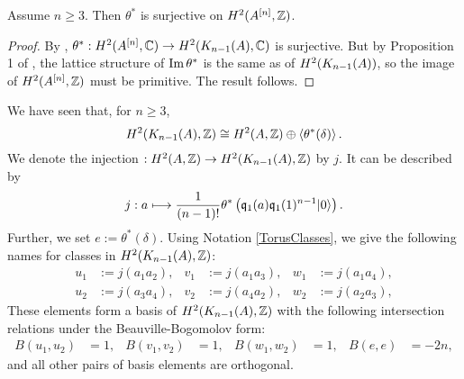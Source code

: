 \begin{proposition}\label{H2Sur} Assume $n\geq 3$. Then
$\theta^*$ is surjective on $H^2(A\hilb{n},\Z)$.
\end{proposition}
\begin{proof}
By \cite[Sect.~7]{Beauville}, $\theta^{\ast} : H^2(A\hilb{n},\C) \rightarrow H^2(\kum{A}{n-1},\C)$ is surjective. 
But by Proposition 1 of \cite{Britze}, the lattice structure of $\im \theta^*$ is the same as of $H^2(\kum{A}{n-1})$, so the image of $H^2(A\hilb{n},\Z)$ must be primitive. The result follows.
\end{proof}
\begin{notation}\label{BasisH2KA}
 We have seen that, for $n\geq 3$,
 $$
 H^2(\kum{A}{n-1},\Z) \cong H^2(A,\Z) \oplus\left<\theta^*(\delta)\right>.
 $$
We denote the injection $ : H^2(A,\Z) \rightarrow H^2(\kum{A}{n-1},\Z)$ by $j$. It can be described by 
$$
j : a \longmapsto \frac{1}{(n-1)!}\theta^*\left(\q_1(a)\q_1(1)^{n-1}\vac\right).
$$ 
Further, we set $e:=\theta^*(\delta)$. Using Notation \ref{TorusClasses}, we give the following names for classes in $H^2(\kum{A}{n-1},\Z)$:
\begin{align*}
u_1 &:= j(a_1 a_2), & v_1 &:= j(a_1 a_3), & w_1 &:= j(a_1 a_4), \\ 
u_2 &:= j(a_3 a_4), & v_2 &:= j(a_4 a_2), & w_2 &:= j(a_2 a_3),
\end{align*}
These elements form a basis of $H^2(\kum{A}{n-1},\Z)$ with the following intersection relations under the Beauville-Bogomolov form:
\begin{align*}
B(u_1,u_2) &= 1, & B(v_1,v_2) &= 1, & B(w_1,w_2) &= 1,  &
B(e,e)&= -2n,
\end{align*}
and all other pairs of basis elements are orthogonal.
\end{notation}

